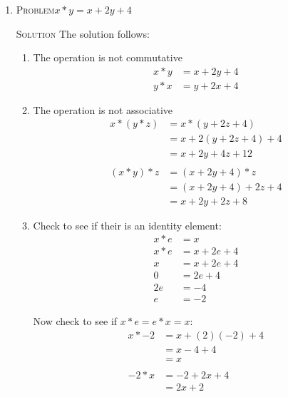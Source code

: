 \documentclass{amsart}
\newcommand{\Solution}{\textsc{Solution}\xspace}
\newcommand{\Problem}{\textsc{Problem}\xspace}
\begin{document}
\begin{enumerate}

   \item \Problem $x*y = x + 2y + 4$ 

   \noindent \Solution The solution follows:

   \begin{enumerate}
      \item The operation is not commutative
      \begin{align*}
         x * y & = x + 2y + 4 \\
	 y * x & = y + 2x + 4
      \end{align*}

      \item The operation is not associative
      \begin{align*}
         x * (y * z) & = x * (y + 2z + 4) \\
	             & = x + 2(y + 2z + 4) + 4 \\
		     & = x + 2y + 4z + 12  \\
\\
         (x * y) * z & = (x + 2y + 4) * z \\
	             & = (x + 2y + 4) + 2z + 4 \\
		     & = x + 2y + 2z + 8
      \end{align*}

      \item Check to see if their is an identity element:
      \begin{align*}
         x * e & = x           \\ 
         x * e & = x + 2e + 4  \\
	     x & = x + 2e + 4  \\
	     0 & =     2e + 4  \\
	    2e & =         -4  \\
	     e & =         -2  
      \end{align*}

      Now check to see if $x*e=e*x=x$:
      \begin{align*}
         x * -2 & = x + (2)(-2) + 4 \\
	        & = x - 4 + 4       \\
		& = x               \\
		\\
	 -2 * x & = -2 + 2x + 4     \\
	        & = 2x + 2          
      \end{align*}


\end{enumerate}
\end{enumerate}
\end{document}

